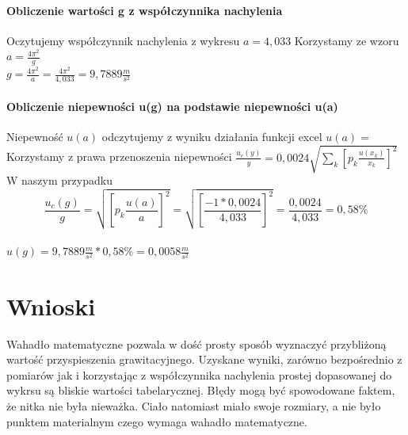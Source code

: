 \documentclass[a4paper,10pt,twoside]{article}
\begin{document}
	\paragraph{Obliczenie wartości g z współczynnika nachylenia } Oczytujemy współczynnik nachylenia z wykresu $a  = 4,033$ Korzystamy ze wzoru $a = \frac{4\pi^2}{g}$ \\ $g = \frac{4\pi^2}{a} = \frac{4\pi^2}{4,033} = 9,7889 \frac{m}{s^2}$
	
	\paragraph{Obliczenie niepewności u(g) na podstawie niepewności u(a)}
	Niepewność $u(a)$ odczytujemy z wyniku działania funkcji excel $u(a) = $ Korzystamy z prawa przenoszenia niepewności $\frac{u_c(y)}{y} = 0,0024 \sqrt{\sum_{k}[p_k\frac{u(x_k)}{x_k}]^2}$ \\ W naszym przypadku $$\frac{u_c(g)}{g} = \sqrt{[p_k\frac{u(a)}{a}]^2} = \sqrt{[\frac{-1 * 0,0024 }{4,033}]^2} = \frac{0,0024}{4,033} = 0,58\%$$ \\
	$u(g) = 9,7889\frac{m}{s^2} * 0,58\% = 0,0058\frac{m}{s^2}$ %
	\section{Wnioski}
	Wahadło matematyczne pozwala w dość prosty sposób wyznaczyć przybliżoną wartość przyspieszenia grawitacyjnego. Uzyskane wyniki, zarówno bezpośrednio z pomiarów jak i korzystając z współczynnika nachylenia prostej dopasowanej do wykrsu są bliskie wartości tabelarycznej. Błędy mogą być spowodowane faktem, że nitka nie była nieważka. Ciało natomiast miało swoje rozmiary, a nie było punktem materialnym czego wymaga wahadło matematyczne.
\end{document}
